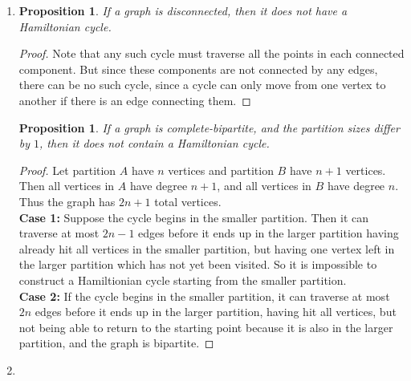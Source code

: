 \documentclass[10pt,oneside,reqno]{amsart}
\theoremstyle{plain}
\newtheorem{Prop}[Thm]{Proposition}
\theoremstyle{definition}
\begin{document}
\begin{enumerate}[label=\arabic*.]
\begin{enumerate}
\begin{enumerate}
\vspace{100mm} 

\end{enumerate}

\item 


\end{enumerate}

\item 
\begin{Prop}
If a graph is disconnected, then it does not have a Hamiltonian cycle. 
\end{Prop}

\begin{proof}
Note that any such cycle must traverse all the points in each connected component. But since these components are not connected by any edges, there can be no such cycle, since a cycle can only move from one vertex to another if there is an edge connecting them. 


\end{proof}

\begin{Prop}
If a graph is complete-bipartite, and the partition sizes differ by $1$, then it does not contain a Hamiltonian cycle. 
\end{Prop}
\begin{proof}
Let partition $A$ have $n$ vertices and partition $B$ have $n+1$ vertices. Then all vertices in $A$ have degree $n + 1$, and all vertices in $B$ have degree $n$. Thus the graph has $2n  +1$ total vertices. \\
\textbf{Case 1:} Suppose the cycle begins in the smaller partition. Then it can traverse at most $2n - 1$ edges before it ends up in the larger partition having already hit all vertices in the smaller partition, but having one vertex left in the larger partition which has not yet been visited. So it is impossible to construct a Hamiltionian cycle starting from the smaller partition. \\
\textbf{Case 2:} If the cycle begins in the smaller partition, it can traverse at most $2n$ edges before it ends up in the larger partition, having hit all vertices, but not being able to return to the starting point because it is also in the larger partition, and the graph is bipartite. 
\end{proof} 

\item 

\begin{enumerate}


\end{enumerate}
\end{enumerate}
\end{document}

